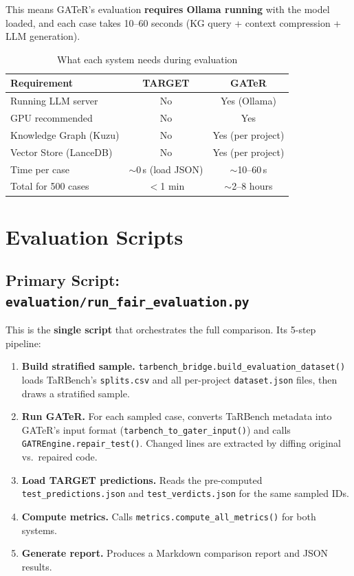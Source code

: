 \documentclass[11pt,a4paper]{article}
\begin{document}
This means GATeR's evaluation \textbf{requires Ollama running} with the
model loaded, and each case takes 10--60 seconds (KG query + context
compression + LLM generation).

\begin{table}[h]
\centering
\caption{What each system needs during evaluation}
\renewcommand{\arraystretch}{1.15}
\begin{tabular}{@{}lcc@{}}
\toprule
\textbf{Requirement} & \textbf{TARGET} & \textbf{GATeR} \\
\midrule
Running LLM server & No & Yes (Ollama) \\
GPU recommended & No & Yes \\
Knowledge Graph (Kuzu) & No & Yes (per project) \\
Vector Store (LanceDB) & No & Yes (per project) \\
Time per case & $\sim$0\,s (load JSON) & $\sim$10--60\,s \\
Total for 500 cases & $<$1 min & $\sim$2--8 hours \\
\bottomrule
\end{tabular}
\end{table}

\section{Evaluation Scripts}
\label{sec:scripts}

\subsection{Primary Script: \texttt{evaluation/run\_fair\_evaluation.py}}

This is the \textbf{single script} that orchestrates the full comparison.
Its 5-step pipeline:

\begin{enumerate}
    \item \textbf{Build stratified sample.}
          \texttt{tarbench\_bridge.build\_evaluation\_dataset()} loads
          TaRBench's \texttt{splits.csv} and all per-project
          \texttt{dataset.json} files, then draws a stratified sample.
    \item \textbf{Run GATeR.}
          For each sampled case, converts TaRBench metadata into GATeR's
          input format (\texttt{tarbench\_to\_gater\_input()}) and calls
          \texttt{GATREngine.repair\_test()}.
          Changed lines are extracted by diffing original vs.\ repaired code.
    \item \textbf{Load TARGET predictions.}
          Reads the pre-computed \texttt{test\_predictions.json} and
          \texttt{test\_verdicts.json} for the same sampled IDs.
    \item \textbf{Compute metrics.}
          Calls \texttt{metrics.compute\_all\_metrics()} for both systems.
    \item \textbf{Generate report.}
          Produces a Markdown comparison report and JSON results.
\end{enumerate}
\end{document}

